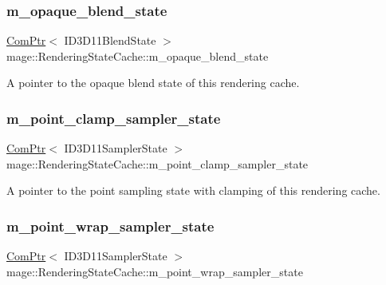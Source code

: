 \subsubsection{\texorpdfstring{m\+\_\+opaque\+\_\+blend\+\_\+state}{m\_opaque\_blend\_state}}
{\footnotesize\ttfamily \hyperlink{namespacemage_ae74f374780900893caa5555d1031fd79}{Com\+Ptr}$<$ I\+D3\+D11\+Blend\+State $>$ mage\+::\+Rendering\+State\+Cache\+::m\+\_\+opaque\+\_\+blend\+\_\+state\hspace{0.3cm}{\ttfamily [private]}}

A pointer to the opaque blend state of this rendering cache. \hypertarget{structmage_1_1_rendering_state_cache_ad53e96f5527120d6cfed5a4759dc0d41}{}\label{structmage_1_1_rendering_state_cache_ad53e96f5527120d6cfed5a4759dc0d41} 
\subsubsection{\texorpdfstring{m\+\_\+point\+\_\+clamp\+\_\+sampler\+\_\+state}{m\_point\_clamp\_sampler\_state}}
{\footnotesize\ttfamily \hyperlink{namespacemage_ae74f374780900893caa5555d1031fd79}{Com\+Ptr}$<$ I\+D3\+D11\+Sampler\+State $>$ mage\+::\+Rendering\+State\+Cache\+::m\+\_\+point\+\_\+clamp\+\_\+sampler\+\_\+state\hspace{0.3cm}{\ttfamily [private]}}

A pointer to the point sampling state with clamping of this rendering cache. \hypertarget{structmage_1_1_rendering_state_cache_ae4011d6ce5effbacf3fd69ffa5d46ebc}{}\label{structmage_1_1_rendering_state_cache_ae4011d6ce5effbacf3fd69ffa5d46ebc} 
\subsubsection{\texorpdfstring{m\+\_\+point\+\_\+wrap\+\_\+sampler\+\_\+state}{m\_point\_wrap\_sampler\_state}}
{\footnotesize\ttfamily \hyperlink{namespacemage_ae74f374780900893caa5555d1031fd79}{Com\+Ptr}$<$ I\+D3\+D11\+Sampler\+State $>$ mage\+::\+Rendering\+State\+Cache\+::m\+\_\+point\+\_\+wrap\+\_\+sampler\+\_\+state\hspace{0.3cm}{\ttfamily [private]}}

